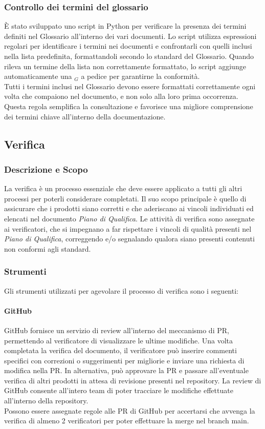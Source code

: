 \documentclass[10pt]{article}
\begin{document}
\begin{justify}
    \subsubsection{Controllo dei termini del glossario}
    È stato sviluppato uno script in Python per verificare la presenza dei termini definiti nel Glossario all'interno dei vari documenti. Lo script utilizza espressioni regolari per identificare i termini nei documenti e confrontarli con quelli inclusi nella lista predefinita, formattandoli secondo lo standard del Glossario. Quando rileva un termine della lista non correttamente formattato, lo script aggiunge automaticamente una $_G$ a pedice per garantirne la conformità.\\
    Tutti i termini inclusi nel Glossario devono essere formattati correttamente ogni volta che compaiono nel documento, e non solo alla loro prima occorrenza. Questa regola semplifica la consultazione e favorisce una migliore comprensione dei termini chiave all'interno della documentazione.

    \subsection{Verifica}
    \label{verifica}
    \subsubsection{Descrizione e Scopo} 
    La verifica è un processo essenziale che deve essere applicato a tutti gli altri processi per poterli considerare completati. Il suo scopo principale è quello di assicurare che i prodotti siano corretti e che aderiscano ai vincoli individuati ed elencati nel documento \textit{Piano di Qualifica}. Le attività di verifica sono assegnate ai verificatori, che si impegnano a far rispettare i vincoli di qualità presenti nel \textit{Piano di Qualifica}, correggendo e/o segnalando qualora siano presenti contenuti non conformi agli standard.
    \subsubsection{Strumenti}
    Gli strumenti utilizzati per agevolare il processo di verifica sono i seguenti:
    \paragraph{GitHub}
    GitHub fornisce un servizio di review all'interno del meccanismo di PR, permettendo al verificatore di visualizzare le ultime modifiche. Una volta completata la verifica del documento, il verificatore può inserire commenti specifici con correzioni o suggerimenti per migliorie e inviare una richiesta di modifica nella PR. In alternativa, può approvare la PR e passare all'eventuale verifica di altri prodotti in attesa di revisione presenti nel repository. La review di GitHub consente all'intero team di poter tracciare le modifiche effettuate all'interno della repository.\\
    Possono essere assegnate regole alle PR di GitHub per accertarsi che avvenga la verifica di almeno 2 verificatori per poter effettuare la merge nel branch main.


\end{justify}
\end{document}
